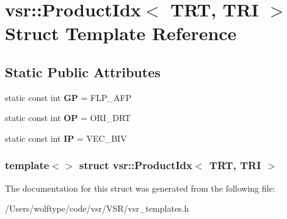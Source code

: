 \hypertarget{structvsr_1_1_product_idx_3_01_t_r_t_00_01_t_r_i_01_4}{\section{vsr\-:\-:Product\-Idx$<$ T\-R\-T, T\-R\-I $>$ Struct Template Reference}
\label{structvsr_1_1_product_idx_3_01_t_r_t_00_01_t_r_i_01_4}
}
\subsection*{Static Public Attributes}
\begin{DoxyCompactItemize}
\item 
\hypertarget{structvsr_1_1_product_idx_3_01_t_r_t_00_01_t_r_i_01_4_a78bbb62fe7a9a57c03f5a5aa710bfaa2}{static const int {\bfseries G\-P} = F\-L\-P\-\_\-\-A\-F\-P}\label{structvsr_1_1_product_idx_3_01_t_r_t_00_01_t_r_i_01_4_a78bbb62fe7a9a57c03f5a5aa710bfaa2}

\item 
\hypertarget{structvsr_1_1_product_idx_3_01_t_r_t_00_01_t_r_i_01_4_ac6cfe387d76dded228e0c566eaaeeafd}{static const int {\bfseries O\-P} = O\-R\-I\-\_\-\-D\-R\-T}\label{structvsr_1_1_product_idx_3_01_t_r_t_00_01_t_r_i_01_4_ac6cfe387d76dded228e0c566eaaeeafd}

\item 
\hypertarget{structvsr_1_1_product_idx_3_01_t_r_t_00_01_t_r_i_01_4_ab53f58a8ad23f29a6db32637970b9777}{static const int {\bfseries I\-P} = V\-E\-C\-\_\-\-B\-I\-V}\label{structvsr_1_1_product_idx_3_01_t_r_t_00_01_t_r_i_01_4_ab53f58a8ad23f29a6db32637970b9777}

\end{DoxyCompactItemize}
\subsubsection*{template$<$$>$ struct vsr\-::\-Product\-Idx$<$ T\-R\-T, T\-R\-I $>$}



The documentation for this struct was generated from the following file\-:\begin{DoxyCompactItemize}
\item 
/\-Users/wolftype/code/vsr/\-V\-S\-R/vsr\-\_\-templates.\-h\end{DoxyCompactItemize}
